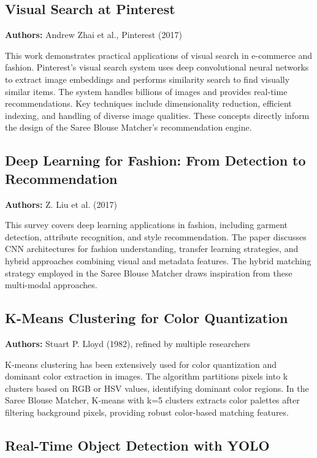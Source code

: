 \documentclass[12pt,a4paper]{report}
\begin{document}
\subsection{Visual Search at Pinterest}

\textbf{Authors:} Andrew Zhai et al., Pinterest (2017)

This work demonstrates practical applications of visual search in e-commerce and fashion. Pinterest's visual search system uses deep convolutional neural networks to extract image embeddings and performs similarity search to find visually similar items. The system handles billions of images and provides real-time recommendations. Key techniques include dimensionality reduction, efficient indexing, and handling of diverse image qualities. These concepts directly inform the design of the Saree Blouse Matcher's recommendation engine.

\subsection{Deep Learning for Fashion: From Detection to Recommendation}

\textbf{Authors:} Z. Liu et al. (2017)

This survey covers deep learning applications in fashion, including garment detection, attribute recognition, and style recommendation. The paper discusses CNN architectures for fashion understanding, transfer learning strategies, and hybrid approaches combining visual and metadata features. The hybrid matching strategy employed in the Saree Blouse Matcher draws inspiration from these multi-modal approaches.

\subsection{K-Means Clustering for Color Quantization}

\textbf{Authors:} Stuart P. Lloyd (1982), refined by multiple researchers

K-means clustering has been extensively used for color quantization and dominant color extraction in images. The algorithm partitions pixels into k clusters based on RGB or HSV values, identifying dominant color regions. In the Saree Blouse Matcher, K-means with k=5 clusters extracts color palettes after filtering background pixels, providing robust color-based matching features.

\subsection{Real-Time Object Detection with YOLO}
\end{document}
